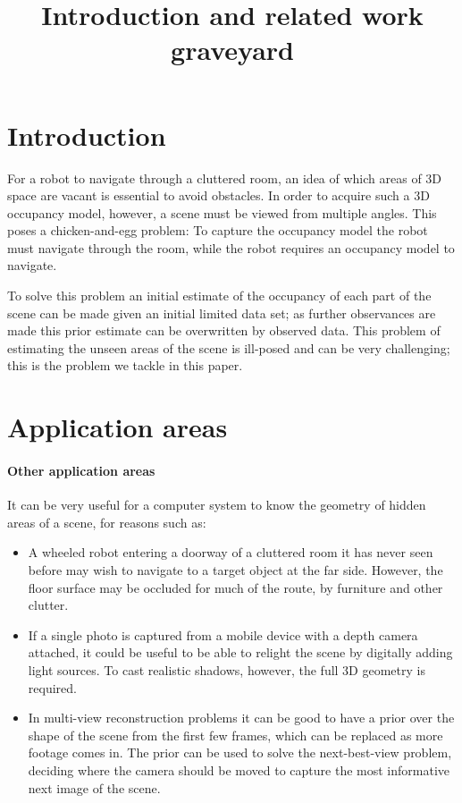 \documentclass[10pt,twocolumn,letterpaper]{article}
\title{Introduction and related work graveyard}
\begin{document}
\maketitle


\section{Introduction}
For a robot to navigate through a cluttered room, an idea of which areas of 3D space are vacant is essential to avoid obstacles.
In order to acquire such a 3D occupancy model, however, a scene must be viewed from multiple angles.
This poses a chicken-and-egg problem: To capture the occupancy model the robot must navigate through the room, while the robot requires an occupancy model to navigate.

To solve this problem an initial estimate of the occupancy of each part of the scene can be made given an initial limited data set; as further observances are made this prior estimate can be overwritten by observed data.
This problem of estimating the unseen areas of the scene is ill-posed and can be very challenging; this is the problem we tackle in this paper.



\section{Application areas}


\paragraph{Other application areas}
It can be very useful for a computer system to know the geometry of hidden areas of a scene, for reasons such as:
\begin{itemize}
\item A wheeled robot entering a doorway of a cluttered room it has never seen before may wish to navigate to a target object at the far side. However, the floor surface may be occluded for much of the route, by furniture and other clutter.
\item If a single photo is captured from a mobile device with a depth camera attached, it could be useful to be able to relight the scene by digitally adding light sources. To cast realistic shadows, however, the full 3D geometry is required.
\item In multi-view reconstruction problems it can be good to have a prior over the shape of the scene from the first few frames, which can be replaced as more footage comes in. The prior can be used to solve the next-best-view problem, deciding where the camera should be moved to capture the most informative next image of the scene.
\end{itemize}
\end{document}
